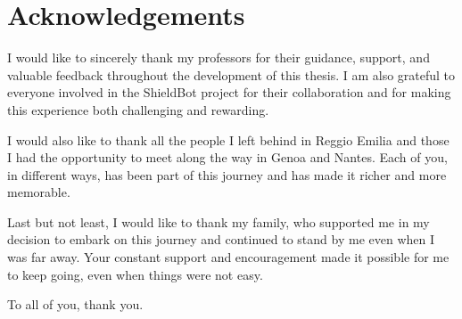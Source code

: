 \section*{Acknowledgements}

I would like to sincerely thank my professors for their guidance, support, and valuable feedback throughout the development of this thesis. I am also grateful to everyone involved in the ShieldBot project for their collaboration and for making this experience both challenging and rewarding.

I would also like to thank all the people I left behind in Reggio Emilia and those I had the opportunity to meet along the way in Genoa and Nantes. Each of you, in different ways, has been part of this journey and has made it richer and more memorable.

Last but not least, I would like to thank my family, who supported me in my decision to embark on this journey and continued to stand by me even when I was far away. Your constant support and encouragement made it possible for me to keep going, even when things were not easy.

To all of you, thank you.